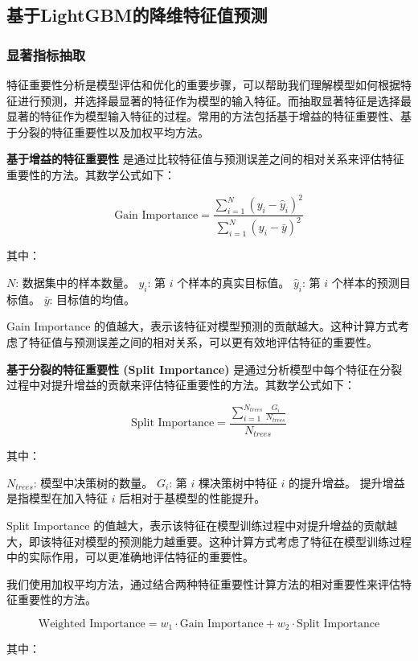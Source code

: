 \documentclass[withoutpreface,bwprint]{cumcmthesis} %
\begin{document}
\subsection{基于LightGBM的降维特征值预测}
\subsubsection{显著指标抽取}
特征重要性分析是模型评估和优化的重要步骤，可以帮助我们理解模型如何根据特征进行预测，并选择最显著的特征作为模型的输入特征。而抽取显著特征是选择最显著的特征作为模型输入特征的过程。常用的方法包括基于增益的特征重要性、基于分裂的特征重要性以及加权平均方法。

	\textbf{基于增益的特征重要性} 是通过比较特征值与预测误差之间的相对关系来评估特征重要性的方法。其数学公式如下：
	
	$$\text{Gain Importance} = \frac{\sum_{i=1}^{N} (y_i - \hat{y}_i)^2}{\sum_{i=1}^{N} (y_i - \bar{y})^2}$$
	
	其中：
	
	   $N$: 数据集中的样本数量。
	  $y_i$: 第 $i$ 个样本的真实目标值。
	   $\hat{y}_i$: 第 $i$ 个样本的预测目标值。
	   $\bar{y}$: 目标值的均值。
	
	Gain Importance 的值越大，表示该特征对模型预测的贡献越大。这种计算方式考虑了特征值与预测误差之间的相对关系，可以更有效地评估特征的重要性。


\textbf{基于分裂的特征重要性 (Split Importance)} 是通过分析模型中每个特征在分裂过程中对提升增益的贡献来评估特征重要性的方法。其数学公式如下：

\begin{equation}\text{Split Importance} = \frac{\sum_{i=1}^{N_{trees}} \frac{G_i}{N_{trees}}}{N_{trees}}\end{equation}


其中：

   $N_{trees}$: 模型中决策树的数量。
   $G_i$: 第 $i$ 棵决策树中特征 $i$ 的提升增益。
提升增益 是指模型在加入特征 $i$ 后相对于基模型的性能提升。

Split Importance 的值越大，表示该特征在模型训练过程中对提升增益的贡献越大，即该特征对模型的预测能力越重要。这种计算方式考虑了特征在模型训练过程中的实际作用，可以更准确地评估特征的重要性。\cite{bib:seven}


我们使用加权平均方法，通过结合两种特征重要性计算方法的相对重要性来评估特征重要性的方法。
	
	$$\text{Weighted Importance} = w_1 \cdot \text{Gain Importance} + w_2 \cdot \text{Split Importance}$$
	
	其中：
	
\end{document}
